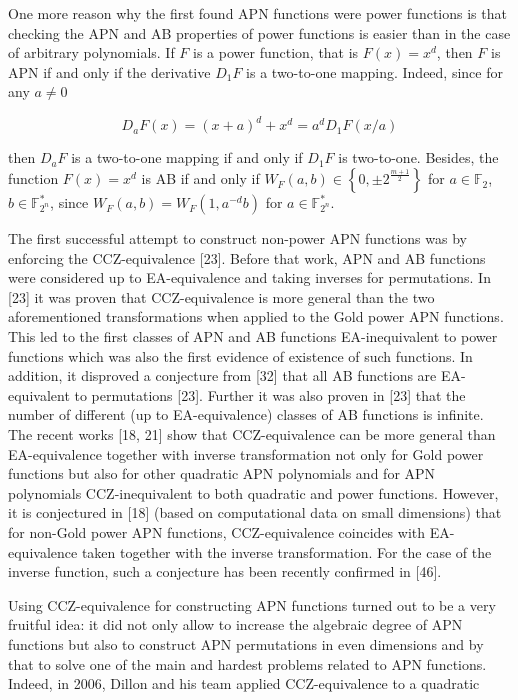 \documentclass[10pt]{article}
\begin{document}
One more reason why the first found APN functions were power functions is that checking the APN and AB properties of power functions is easier than in the case of arbitrary polynomials. If $F$ is a power function, that is $F(x)=x^{d}$, then $F$ is APN if and only if the derivative $D_{1} F$ is a two-to-one mapping. Indeed, since for any $a \neq 0$

$$
D_{a} F(x)=(x+a)^{d}+x^{d}=a^{d} D_{1} F(x / a)
$$

then $D_{a} F$ is a two-to-one mapping if and only if $D_{1} F$ is two-to-one. Besides, the function $F(x)=x^{d}$ is AB if and only if $W_{F}(a, b) \in\left\{0, \pm 2^{\frac{m+1}{2}}\right\}$ for $a \in \mathbb{F}_{2}$, $b \in \mathbb{F}_{2^{n}}^{*}$, since $W_{F}(a, b)=W_{F}\left(1, a^{-d} b\right)$ for $a \in \mathbb{F}_{2^{n}}^{*}$.

The first successful attempt to construct non-power APN functions was by enforcing the CCZ-equivalence [23]. Before that work, APN and AB functions were considered up to EA-equivalence and taking inverses for permutations. In [23] it was proven that CCZ-equivalence is more general than the two aforementioned transformations when applied to the Gold power APN functions. This led to the first classes of APN and AB functions EA-inequivalent to power functions which was also the first evidence of existence of such functions. In addition, it disproved a conjecture from [32] that all AB functions are EA-equivalent to permutations [23]. Further it was also proven in [23] that the number of different (up to EA-equivalence) classes of AB functions is infinite. The recent works [18, 21] show that CCZ-equivalence can be more general than EA-equivalence together with inverse transformation not only for Gold power functions but also for other quadratic APN polynomials and for APN polynomials CCZ-inequivalent to both quadratic and power functions. However, it is conjectured in [18] (based on computational data on small dimensions) that for non-Gold power APN functions, CCZ-equivalence coincides with EA-equivalence taken together with the inverse transformation. For the case of the inverse function, such a conjecture has been recently confirmed in [46].

Using CCZ-equivalence for constructing APN functions turned out to be a very fruitful idea: it did not only allow to increase the algebraic degree of APN functions but also to construct APN permutations in even dimensions and by that to solve one of the main and hardest problems related to APN functions. Indeed, in 2006, Dillon and his team applied CCZ-equivalence to a quadratic
\end{document}
